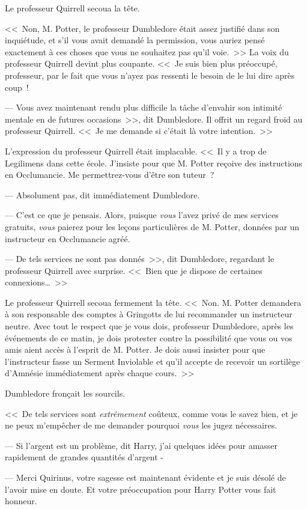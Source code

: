 Le professeur Quirrell secoua la tête.

<<~Non, M. Potter, le professeur Dumbledore était assez justifié dans son inquiétude, et s'il vous avait demandé la permission, vous auriez pensé exactement à ces choses que vous ne souhaitez pas qu'il voie.~>> La voix du professeur Quirrell devint plus coupante. <<~Je suis bien plus préoccupé, professeur, par le fait que vous n'ayez pas ressenti le besoin de le lui dire après coup~!

--- Vous avez maintenant rendu plus difficile la tâche d'envahir son intimité mentale en de futures occasions~>>, dit Dumbledore. Il offrit un regard froid au professeur Quirrell. <<~Je me demande si c'était là votre intention.~>>

L'expression du professeur Quirrell était implacable. <<~Il y a trop de Legilimens dans cette école. J'insiste pour que M. Potter reçoive des instructions en Occlumancie. Me permettrez-vous d'être son tuteur~?

--- Absolument pas, dit immédiatement Dumbledore.

--- C'est ce que je pensais. Alors, puisque \emph{vous} l'avez privé de mes services gratuits, \emph{vous} paierez pour les leçons particulières de M. Potter, données par un instructeur en Occlumancie agréé.

--- De tels services ne sont pas donnés~>>, dit Dumbledore, regardant le professeur Quirrell avec surprise. <<~Bien que je dispose de certaines connexions…~>>

Le professeur Quirrell secoua fermement la tête. <<~Non. M. Potter demandera à son responsable des comptes à Gringotts de lui recommander un instructeur neutre. Avec tout le respect que je vous dois, professeur Dumbledore, après les événements de ce matin, je dois protester contre la possibilité que vous ou vos amis aient accès à l'esprit de M. Potter. Je dois aussi insister pour que l'instructeur fasse un Serment Inviolable et qu'il accepte de recevoir un sortilège d'Amnésie immédiatement après chaque cours.~>>

Dumbledore fronçait les sourcils.

<<~De tels services sont \emph{extrêmement} coûteux, comme vous le savez bien, et je ne peux m'empêcher de me demander pourquoi \emph{vous} les jugez nécessaires.

--- Si l'argent est un problème, dit Harry, j'ai quelques idées pour amasser rapidement de grandes quantités d'argent -

--- Merci Quirinus, votre sagesse est maintenant évidente et je suis désolé de l'avoir mise en doute. Et votre préoccupation pour Harry Potter vous fait honneur.


